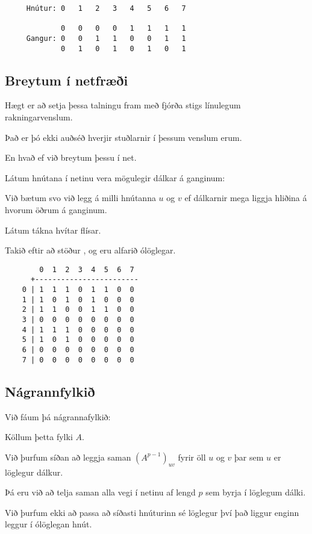 { \begin{verbatim}
     Hnútur: 0   1   2   3   4   5   6   7

             0   0   0   0   1   1   1   1
     Gangur: 0   0   1   1   0   0   1   1
             0   1   0   1   0   1   0   1
\end{verbatim}}
\subsection{Breytum í netfræði}
{
    {
        \item<1-> Hægt er að setja þessa talningu fram með fjórða stigs línulegum rakningarvenslum.
        \item<2-> Það er þó ekki auðséð hverjir stuðlarnir í þessum venslum erum.
        \item<3-> En hvað ef við breytum þessu í net.
        \item<4-> Látum hnútana í netinu vera mögulegir dálkar á ganginum:
        \item<5->[] \gangar
        \item<6-> Við bætum svo við legg á milli hnútanna $u$ og $v$ ef dálkarnir mega liggja hliðina á hvorum öðrum á ganginum.
        \item<7-> Látum  tákna hvítar flísar.
        \item<8-> Takið eftir að stöður ,  og  eru alfarið ólöglegar.
    }
}

{ \begin{verbatim}
        0  1  2  3  4  5  6  7
      +------------------------
    0 | 1  1  1  0  1  1  0  0
    1 | 1  0  1  0  1  0  0  0
    2 | 1  1  0  0  1  1  0  0
    3 | 0  0  0  0  0  0  0  0
    4 | 1  1  1  0  0  0  0  0
    5 | 1  0  1  0  0  0  0  0
    6 | 0  0  0  0  0  0  0  0
    7 | 0  0  0  0  0  0  0  0
\end{verbatim}}
\subsection{Nágrannfylkið}
{
    {
        \item<1-> Við fáum þá nágrannafylkið:
        \item<2->[] \gangarfylki
        \item<3-> Köllum þetta fylki $A$.
        \item<4-> Við þurfum síðan að leggja saman $(A^{p - 1})_{uv}$ fyrir öll $u$ og $v$ þar sem $u$ er löglegur dálkur.
        \item<5-> Þá eru við að telja saman alla vegi í netinu af lengd $p$ sem byrja í löglegum dálki.
        \item<6-> Við þurfum ekki að passa að síðasti hnúturinn sé löglegur því það liggur enginn leggur í ólöglegan hnút.
    }
}

